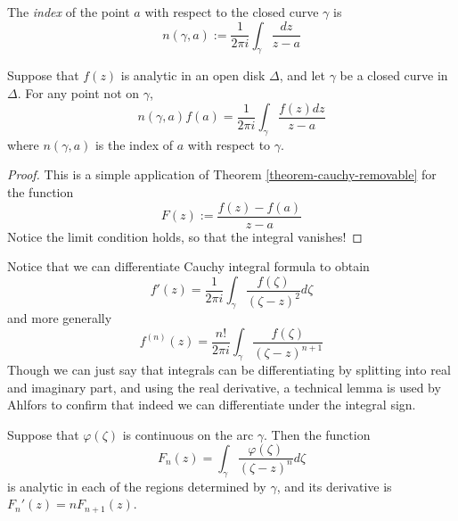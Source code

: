 \begin{definition}
\label{definition-index}
The {\it index} of the point $a$ with respect
to the closed curve $\gamma$ is
\begin{equation}
\label{equation-index}
n(\gamma,a):=\frac{1}{2\pi
i}\int_\gamma\frac{dz}{z-a}
\end{equation}
\end{definition}

\begin{theorem}
\label{theorem-cauchy-integral-formula}
\begin{reference}
\cite[Section 2.2, Theorem 6]{ahl}
\end{reference}
Suppose that $f(z)$ is analytic in an open
disk $\Delta$, and let $\gamma$ be a
closed curve in $\Delta$. For any point not
on $\gamma$,
\begin{equation}
\label{equation-cauchy-integral-formula}
n(\gamma,a)f(a)=\frac{1}{2\pi
i}\int_\gamma\frac{f(z)dz}{z-a}
\end{equation}
where $n(\gamma,a)$ is the index of $a$ with
respect to $\gamma$.
\end{theorem}

\begin{proof}
This is a simple application of Theorem
\ref{theorem-cauchy-removable} for the
function
$$
F(z):=\frac{f(z)-f(a)}{z-a}
$$
Notice the limit condition holds, so that the
integral vanishes!
\end{proof}

\noindent
Notice that we can differentiate Cauchy
integral formula to obtain
\begin{equation}
\label{equation-first-deriv-formu}
f'(z)=\frac{1}{2\pi
i}\int_\gamma\frac{f(\zeta)}{(\zeta-z)^2}
d\zeta
\end{equation}
and more generally
$$
f^{(n)}(z)=\frac{n!}{2\pi i}\int_\gamma
\frac{f(\zeta)}{(\zeta-z)^{n+1}}
$$
Though we can just say that integrals can be
differentiating by splitting into
real and imaginary part, and using the real
derivative, a technical lemma is
used by Ahlfors to confirm that indeed we can
differentiate
under the integral sign.

\begin{lemma}
\label{lemma-differentiation-of-integral}
Suppose that $\varphi(\zeta)$ is continuous
on the arc $\gamma$.
Then the function
$$
F_n(z)=\int_\gamma
\frac{\varphi(\zeta)}{(\zeta-z)^n}d\zeta
$$
is analytic in each of the regions determined
by $\gamma$,
and its derivative is $F_n'(z)=nF_{n+1}(z)$.
\end{lemma}

